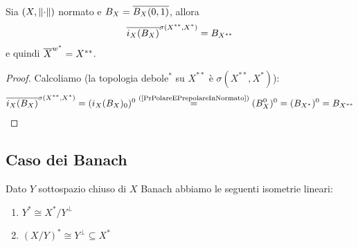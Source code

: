 \begin{theorem}[Goldstine]\label{ThGoldstine}
Sia $(X,\normd)$ normato e $B_X=\ol{B_X(0,1)}$, allora
\[\ol{i_X(B_X)}^{\sigma(X^{\ast\ast},X^\ast)}=B_{X^{\ast\ast}}\]
e quindi $\ol{X}^{w^\ast}=X^{\ast\ast}$.
\end{theorem}
\begin{proof}
Calcoliamo (la topologia debole$^\ast$ su $X^{\ast\ast}$ \`e $\sigma(X^{\ast\ast},X^\ast)$):
\begin{align*}
    \ol{i_X(B_X)}^{\sigma(X^{\ast\ast},X^\ast)}=(i_X(B_X)_0)^0\pasgnl={(\ref{PrPolareEPrepolareInNormato})}(B_X^0)^0=(B_{X^\ast})^0=B_{X^{\ast\ast}}
\end{align*}
\end{proof}


\subsection{Caso dei Banach}
\begin{proposition}\label{PrDualeDiSottospaziEDualeQuoziente}
Dato $Y$ sottospazio chiuso di $X$ Banach abbiamo le seguenti isometrie lineari:
\begin{enumerate}
    \item $Y^\ast\cong X^\ast/Y^\perp$
    \item $(X/Y)^\ast\cong Y^\perp\subseteq X^\ast$
\end{enumerate}
\end{proposition}

